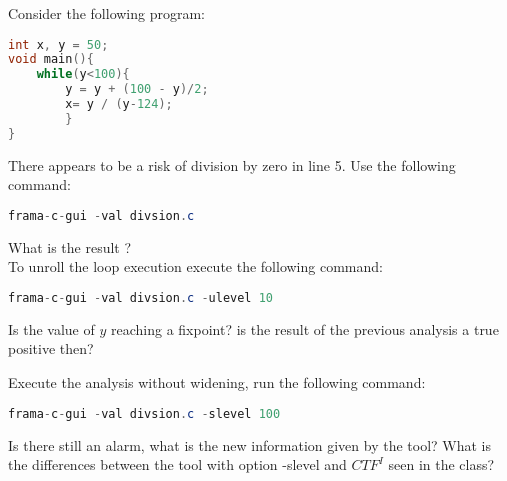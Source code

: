 \documentclass[language=en,sheet=3,prefix]{exercise}
\begin{document}
Consider the following program:\\
\begin{lstlisting}[language=c]
int x, y = 50;
void main(){
	while(y<100){
		y = y + (100 - y)/2;
		x= y / (y-124);
		}
}
\end{lstlisting}
There appears to be a risk of division by zero in line 5. Use the following command:
\begin{lstlisting}[language=Java]
frama-c-gui -val divsion.c
\end{lstlisting}
What is the result ?\\
To unroll the loop execution execute the following command:
\begin{lstlisting}[language=Java]
frama-c-gui -val divsion.c -ulevel 10
\end{lstlisting}
Is the value of  $y$ reaching a fixpoint? is the result of the previous analysis a true positive then?

Execute the analysis without widening, run the following command:
\begin{lstlisting}[language=Java]
frama-c-gui -val divsion.c -slevel 100
\end{lstlisting}

Is there still an alarm, what is the new information given by the tool? What is the differences between the tool with option -slevel and  $CTF^I$ seen in the class?
\end{document}
